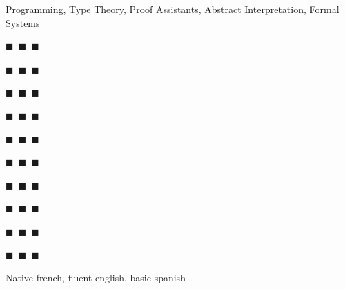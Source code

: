 \documentclass[a4paper,11pt]{extarticle}
\newcommand{\skdabb} {\colorbox{ForestGreen!80!white}{\color{skcol}$\blacksquare$~\color{noskcol}$\blacksquare$~\color{noskcol}$\blacksquare$}}
\newcommand{\skmore} {\colorbox{ForestGreen!80!white}{\color{skcol}$\blacksquare$~\color{skcol}$\blacksquare$~\color{noskcol}$\blacksquare$}}
\newcommand{\skexp}  {\colorbox{ForestGreen!80!white}{\color{skcol}$\blacksquare$~\color{skcol}$\blacksquare$~\color{skcol}$\blacksquare$}}
\begin{document}
\begin{minipage}[c]{0.35\linewidth}
\begin{tcolorbox}
        \vspace{0.3cm}

        Programming, Type Theory, Proof Assistants,
        Abstract Interpretation, Formal Systems


        \vspace{0.3cm}
        \begin{description}\setlength{\itemsep}{0em}
          \item[C++]\hfill\skexp
          \item[Rust]\hfill\skexp
          \item[Shell]\hfill\skexp
          \item[Nix]\hfill\skexp
          \item[Haskell]\hfill\skmore
          \item[\LaTeX]\hfill\skmore
          \item[Coq]\hfill\skmore
          \item[Prolog]\hfill\skmore
          \item[OCaml]\hfill\skmore
          \item[Python]\hfill\skdabb
        \end{description}

        \vspace{0cm}

        Native french, fluent english, basic spanish


    \end{tcolorbox}\end{minipage}
    \hfill
\end{document}
